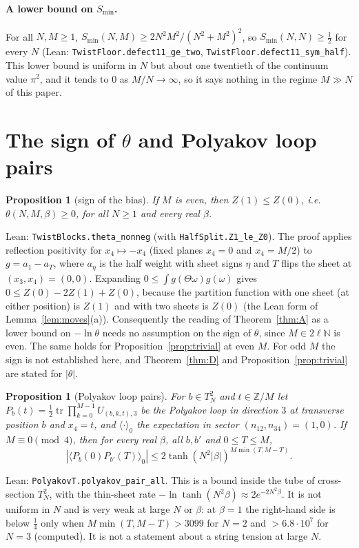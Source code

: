 \documentclass[11pt,a4paper]{article}
\newtheorem{proposition}[lemma]{Proposition}
\theoremstyle{definition}
\theoremstyle{remark}
\newcommand{\tr}{\operatorname{tr}}
\newcommand{\code}[1]{\texttt{#1}}
\begin{document}
\paragraph{A lower bound on $S_{\min}$.}
For all $N,M\ge1$, $S_{\min}(N,M)\ge2N^2M^2/(N^2+M^2)^2$, so $S_{\min}(N,N)\ge\frac12$ for every $N$ (Lean: \code{TwistFloor.defect11\_ge\_two}, \code{TwistFloor.defect11\_sym\_half}).
This lower bound is uniform in $N$ but about one twentieth of the continuum value $\pi^2$, and it tends to $0$ as $M/N\to\infty$, so it says nothing in the regime $M\gg N$ of this paper.

\section{The sign of $\theta$ and Polyakov loop pairs}\label{sec:sign}

\begin{proposition}[sign of the bias]\label{prop:sign}
If $M$ is even, then $Z(1)\le Z(0)$, i.e.\ $\theta(N,M,\beta)\ge0$, for all $N\ge1$ and every real $\beta$.
\end{proposition}
Lean: \code{TwistBlocks.theta\_nonneg} (with \code{HalfSplit.Z1\_le\_Z0}). The proof applies reflection positivity for $x_4\mapsto-x_4$ (fixed planes $x_4=0$ and $x_4=M/2$) to $g=a_1-a_T$, where $a_\eta$ is the half weight with sheet signs $\eta$ and $T$ flips the sheet at $(x_3,x_4)=(0,0)$.
Expanding $0\le\int g(\Theta\omega)g(\omega)$ gives $0\le Z(0)-2Z(1)+Z(0)$, because the partition function with one sheet (at either position) is $Z(1)$ and with two sheets is $Z(0)$ (the Lean form of Lemma~\ref{lem:moves}(a)).
Consequently the reading of Theorem~\ref{thm:A} as a lower bound on $-\ln\theta$ needs no assumption on the sign of $\theta$, since $M\in2\ell\mathbb{N}$ is even.
The same holds for Proposition~\ref{prop:trivial} at even $M$.
For odd $M$ the sign is not established here, and Theorem~\ref{thm:D} and Proposition~\ref{prop:trivial} are stated for $|\theta|$.

\begin{proposition}[Polyakov loop pairs]\label{prop:poly}
For $b\in T^2_N$ and $t\in\mathbb{Z}/M$ let $P_b(t)=\frac12\tr\prod_{k=0}^{M-1}U_{(b,k,t),3}$ be the Polyakov loop in direction $3$ at transverse position $b$ and $x_4=t$, and $\langle\cdot\rangle_0$ the expectation in sector $(n_{12},n_{34})=(1,0)$. If $M\equiv0\pmod4$, then for every real $\beta$, all $b,b'$ and $0\le T\le M$,
\[ |\langle P_b(0)P_{b'}(T)\rangle_0|\le2\tanh(N^2|\beta|)^{M\min(T,M-T)}. \]
\end{proposition}
Lean: \code{PolyakovT.polyakov\_pair\_all}. This is a bound inside the tube of cross-section $T^2_N$, with the thin-sheet rate $-\ln\tanh(N^2\beta)\approx2e^{-2N^2\beta}$.
It is not uniform in $N$ and is very weak at large $N$ or $\beta$: at $\beta=1$ the right-hand side is below $\frac14$ only when $M\min(T,M-T)>3099$ for $N=2$ and $>6.8\cdot10^7$ for $N=3$ (computed). It is not a statement about a string tension at large $N$.
\end{document}

